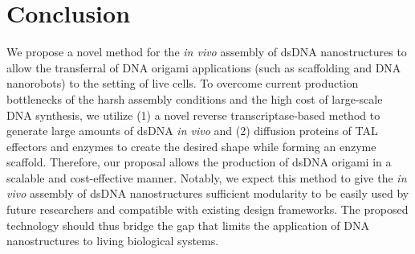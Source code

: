 \documentclass[a4paper]{article}
\begin{document}
\section*{Conclusion}
We propose a novel method for the \textit{in vivo} assembly of dsDNA nanostructures to allow the transferral of  DNA origami applications (such as scaffolding and DNA nanorobots) to the setting of live cells.
To overcome current production bottlenecks of the harsh assembly conditions and the high cost of large-scale DNA synthesis, we utilize (1) a novel reverse transcriptase-based method to generate large amounts of dsDNA \textit{in vivo} and (2) diffusion proteins of TAL effectors and enzymes to create the desired shape while forming an enzyme scaffold.
Therefore, our proposal allows the production of dsDNA origami in a scalable and cost-effective manner.
Notably, we expect this method to give the \textit{in vivo} assembly of dsDNA nanostructures sufficient modularity to be easily used by future researchers and compatible with existing design frameworks.
The proposed technology should thus bridge the gap that limits the application of DNA nanostructures to living biological systems.


\end{document}
